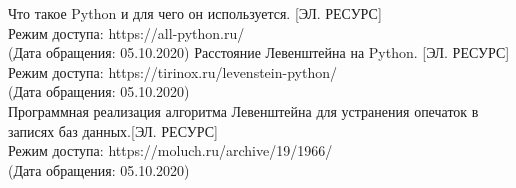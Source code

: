 \documentclass[a4paper]{article}
\begin{document}
	
	\begin{thebibliography}{3}
		Что такое Python и для чего он используется. [ЭЛ. РЕСУРС]\\
		 Режим доступа: https://all-python.ru/ \\
		 (Дата обращения: 05.10.2020)
		Расстояние Левенштейна на Python. [ЭЛ. РЕСУРС] \\
		Режим доступа: https://tirinox.ru/levenstein-python/ \\
		(Дата обращения: 05.10.2020)\\
		Программная реализация алгоритма Левенштейна для устранения опечаток в записях баз данных.[ЭЛ. РЕСУРС]\\
		 Режим доступа: https://moluch.ru/archive/19/1966/ \\
		 (Дата обращения: 05.10.2020)
		 
	\end{thebibliography}
\end{document}

